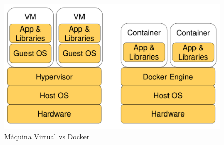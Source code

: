 \documentclass[twoside,english,brazilian]{UNISINOSartigo}
\begin{document}
\begin{figure}[!ht]
	\caption{Máquina Virtual vs Docker}
	\label{fig:vmvsdocker}
	\centering%
	\begin{minipage}{.4\textwidth}
		\includegraphics[width=\textwidth]{images/VMxDocker}
	\end{minipage}
\end{figure}
\end{document}
